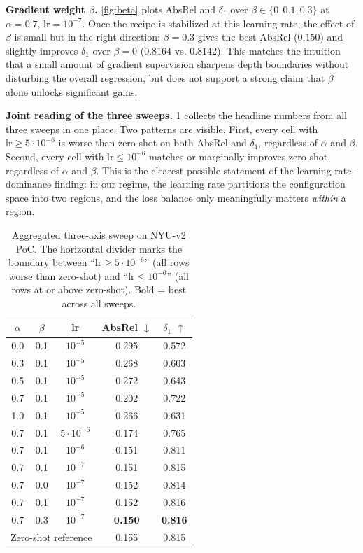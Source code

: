 \documentclass[10pt,twocolumn,letterpaper]{article}
\begin{document}
\textbf{Gradient weight $\beta$.} \cref{fig:beta} plots AbsRel and
$\delta_1$ over $\beta \in \{0, 0.1, 0.3\}$ at $\alpha=0.7$,
$\text{lr}=10^{-7}$. Once the recipe is stabilized at this learning
rate, the effect of $\beta$ is small but in the right direction:
$\beta=0.3$ gives the best AbsRel ($0.150$) and slightly improves
$\delta_1$ over $\beta=0$ ($0.8164$ vs. $0.8142$). This matches the
intuition that a small amount of gradient supervision sharpens depth
boundaries without disturbing the overall regression, but does not
support a strong claim that $\beta$ alone unlocks significant gains.

\textbf{Joint reading of the three sweeps.} \cref{tab:fullsweep}
collects the headline numbers from all three sweeps in one place. Two
patterns are visible. First, every cell with $\text{lr}\ge 5{\cdot}10^{-6}$
is worse than zero-shot on both AbsRel and $\delta_1$, regardless of
$\alpha$ and $\beta$. Second, every cell with $\text{lr}\le 10^{-6}$
matches or marginally improves zero-shot, regardless of $\alpha$ and
$\beta$. This is the clearest possible statement of the
learning-rate-dominance finding: in our regime, the learning rate
partitions the configuration space into two regions, and the loss
balance only meaningfully matters \emph{within} a region.

\begin{table}[t]
\centering
\small
\begin{tabular}{ccccc}
\toprule
$\alpha$ & $\beta$ & lr & AbsRel $\downarrow$ & $\delta_1$ $\uparrow$ \\
\midrule
0.0 & 0.1 & $10^{-5}$ & 0.295 & 0.572 \\
0.3 & 0.1 & $10^{-5}$ & 0.268 & 0.603 \\
0.5 & 0.1 & $10^{-5}$ & 0.272 & 0.643 \\
0.7 & 0.1 & $10^{-5}$ & 0.202 & 0.722 \\
1.0 & 0.1 & $10^{-5}$ & 0.266 & 0.631 \\
\midrule
0.7 & 0.1 & $5{\cdot}10^{-6}$ & 0.174 & 0.765 \\
0.7 & 0.1 & $10^{-6}$ & 0.151 & 0.811 \\
0.7 & 0.1 & $10^{-7}$ & 0.151 & 0.815 \\
\midrule
0.7 & 0.0 & $10^{-7}$ & 0.152 & 0.814 \\
0.7 & 0.1 & $10^{-7}$ & 0.152 & 0.816 \\
0.7 & 0.3 & $10^{-7}$ & \textbf{0.150} & \textbf{0.816} \\
\midrule
\multicolumn{3}{l}{Zero-shot reference} & 0.155 & 0.815 \\
\bottomrule
\end{tabular}
\caption{Aggregated three-axis sweep on NYU-v2 PoC. The horizontal
divider marks the boundary between ``$\text{lr}\ge 5{\cdot}10^{-6}$''
(all rows worse than zero-shot) and ``$\text{lr}\le 10^{-6}$''
(all rows at or above zero-shot). Bold = best across all sweeps.}
\label{tab:fullsweep}
\end{table}
\end{document}
